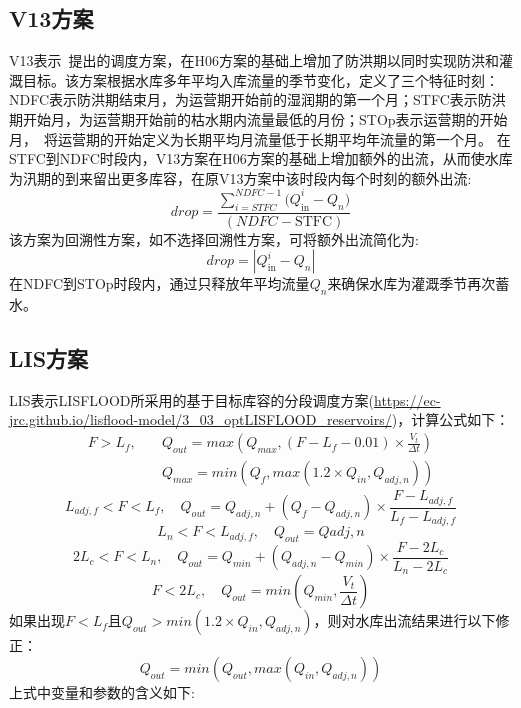 \subsection{V13方案}
V13表示~\cite{voisin2013improved}提出的调度方案，在H06方案的基础上增加了防洪期以同时实现防洪和灌溉目标。该方案根据水库多年平均入库流量的季节变化，定义了三个特征时刻：NDFC表示防洪期结束月，为运营期开始前的湿润期的第一个月；STFC表示防洪期开始月，为运营期开始前的枯水期内流量最低的月份；STOp表示运营期的开始月，~\cite{hanasaki2006reservoir}将运营期的开始定义为长期平均月流量低于长期平均年流量的第一个月。
在STFC到NDFC时段内，V13方案在H06方案的基础上增加额外的出流，从而使水库为汛期的到来留出更多库容，在原V13方案中该时段内每个时刻的额外出流:
\begin{equation}
    drop = \frac{\sum_{i = STFC}^{NDFC - 1}{{(Q}_{\text{in}}^{i} - Q_{n})}}{\left( NDFC - \text{STFC} \right)}
\end{equation}
该方案为回溯性方案，如不选择回溯性方案，可将额外出流简化为:
\begin{equation}
    drop = \left| Q_{\text{in}}^{i} - Q_{n} \right|
\end{equation}
在NDFC到STOp时段内，通过只释放年平均流量$Q_{n}$来确保水库为灌溉季节再次蓄水。

\subsection{LIS方案}
LIS表示LISFLOOD所采用的基于目标库容的分段调度方案(\url{https://ec-jrc.github.io/lisflood-model/3\_03\_optLISFLOOD\_reservoirs/})，计算公式如下：
\begin{equation}
\begin{aligned}
    F > L_{f}, \quad &Q_{out}={max(Q_{max}, (F-L_{f}-0.01) \times \frac{V_t}{\Delta t})} \\
    \quad &Q_{max} = {min(Q_{f}, {max(1.2 \times Q_{in},Q_{adj,n})})}
\end{aligned}
\end{equation}
\begin{equation}
    L_{adj,f} < F < L_{f}, \quad Q_{out}=Q_{adj,n}+\left(Q_{f}-Q_{adj,n}\right) \times \frac{F-L_{adj,f}}{L_{f}-L_{adj,f}}
\end{equation}
\begin{equation}
    L_{n} < F < L_{adj,f}, \quad Q_{out}=Q{adj,n}
\end{equation}
\begin{equation}
    2L_{c} < F < L_{n}, \quad Q_{out}=Q_{min}+\left(Q_{adj,n}-Q_{min}\right) \times \frac{F-2L_{c}}{L_{n}-2L_{c}}
\end{equation}
\begin{equation}
    F < 2L_{c}, \quad Q_{out}={min(Q_{min}, \frac{V_t}{\Delta t})}
\end{equation}
如果出现$F<L_{f}$且$Q_{out}>{min(1.2 \times Q_{in}, Q_{adj,n})}$，则对水库出流结果进行以下修正：
\begin{equation}
    Q_{out} = {min(Q_{out}, {max(Q_{in}, Q_{adj,n})})}
\end{equation}
上式中变量和参数的含义如下:


